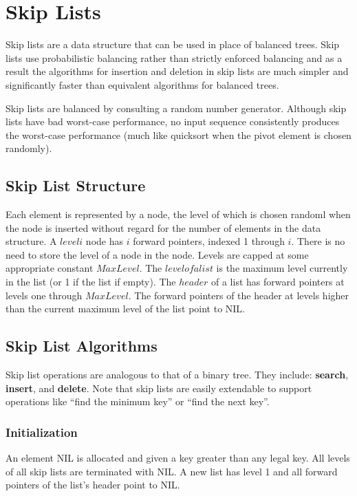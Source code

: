 \documentclass[12pt]{article}
\begin{document}
\section*{Skip Lists}
Skip lists are a data structure that can be used in place
of balanced trees. Skip lists use probabilistic balancing
rather than strictly enforced balancing and as a result
the algorithms for insertion and deletion in skip lists
are much simpler and significantly faster than equivalent
algorithms for balanced trees.

Skip lists are balanced by consulting a random number 
generator. Although skip lists have bad worst-case
performance, no input sequence consistently produces the
worst-case performance (much like quicksort when the pivot
element is chosen randomly).

\subsection*{Skip List Structure}
Each element is represented by a node, the level of 
which is chosen randoml when the node is inserted
without regard for the number of elements in the
data structure. A $level i$ node has $i$ forward
pointers, indexed 1 through $i$. There is no need
to store the level of a node in the node. Levels
are capped at some appropriate constant $MaxLevel$.
The $level of a list$ is the maximum level currently
in the list (or 1 if the list if empty). The $header$
of a list has forward pointers at levels one through
$MaxLevel$. The forward pointers of the header at
levels higher than the current maximum level of the
list point to NIL.


\subsection*{Skip List Algorithms}
Skip list operations are analogous to that of a binary
tree. They include: \textbf{search}, \textbf{insert},
and \textbf{delete}. Note that skip lists are easily
extendable to support operations like ``find the minimum key'' or ``find the next key''.

\subsubsection*{Initialization}
An element NIL is allocated and given a key
greater than any legal key. All levels of all
skip lists are terminated with NIL. A new list
has level 1 and all forward pointers of the list's
header point to NIL.
\end{document}

